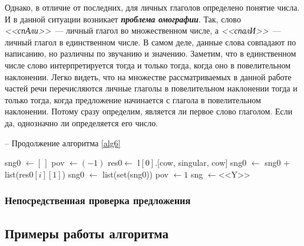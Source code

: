 \documentclass[main]{subfiles}
\begin{document}
Однако, в отличие от последних, для личных глаголов определено понятие числа. И в данной ситуации возникает\textit{\textbf{ проблема омографии}}. Так, слово \textit{<<спАли>>}~--- личный глагол во множественном числе, а \textit{<<спалИ>>}~--- личный глагол в единственном числе. В самом деле, данные слова совпадают по написанию, но различны по звучанию и значению. Заметим, что в единственном числе слово интерпретируется тогда и только тогда, когда оно  в повелительном наклонении. Легко видеть, что на множестве рассматриваемых в данной работе частей речи перечисляются личные глаголы в повелительном наклонении тогда и только тогда, когда предложение начинается с глагола в повелительном наклонении. Потому сразу определим, является ли первое слово глаголом. Если да, однозначно ли определяется его число.
\begin{algorithm}
	\caption{-- Продолжение алгоритма \ref{alg6}}\label{alg12}
	\begin{algorithmic}[1]
		\State sng0 $\gets [\,]$
		\State pov $\gets (-1)$
		\State res0$\gets$ l$[0].[$cow, singular, cow$]$
		\State sng0 $\gets$ sng0 + list(res0$[i][1]$)
		\EndIf
		\EndFor
		\State sng0 $\gets$ list(set(sng0))
		\State pov $\gets 1$
		\State sng $\gets $<<Y>>  
		\EndIf
		\EndIf
		\EndIf
	\end{algorithmic}
\end{algorithm}

\subsubsection{Непосредственная проверка предложения}
\subsection{Примеры работы алгоритма}
\end{document}
